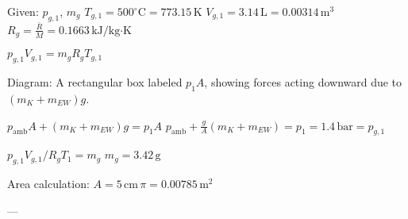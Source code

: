 Given: \( p_{g,1} \), \( m_g \)  
\( T_{g,1} = 500^\circ \text{C} = 773.15 \, \text{K} \)  
\( V_{g,1} = 3.14 \, \text{L} = 0.00314 \, \text{m}^3 \)  
\( R_g = \frac{\bar{R}}{M} = 0.1663 \, \text{kJ/kg·K} \)  

\( p_{g,1} V_{g,1} = m_g R_g T_{g,1} \)  

Diagram: A rectangular box labeled \( p_1 A \), showing forces acting downward due to \( (m_K + m_{EW}) g \).  

\( p_{\text{amb}} A + (m_K + m_{EW}) g = p_1 A \)  
\( p_{\text{amb}} + \frac{g}{A} (m_K + m_{EW}) = p_1 = 1.4 \, \text{bar} = p_{g,1} \)  

\( p_{g,1} V_{g,1} / R_g T_{1} = m_g \)  
\( m_g = 3.42 \, \text{g} \)  

Area calculation:  
\( A = 5 \, \text{cm} \, \pi = 0.00785 \, \text{m}^2 \)  

---